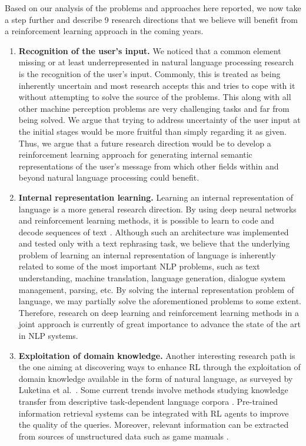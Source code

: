 \label{directions}
Based on our analysis of the problems and approaches here reported, we now take a step further and describe 9 research directions that we believe will benefit from a reinforcement learning approach in the coming years.
\begin{enumerate}
\item {\bf Recognition of the user's input.}
We noticed that a common element missing or at least underrepresented in natural language processing research is the recognition of the user's input. Commonly, this is treated as being inherently uncertain and most research accepts this and tries to cope with it without attempting to solve the source of the problems. This along with all other machine perception problems are very challenging tasks and far from being solved. We argue that trying to address uncertainty of the user input at the initial stages would be more fruitful than simply regarding it as given. Thus, we argue that a future research direction would be to develop a reinforcement learning approach for generating internal semantic representations of the user's message from which other fields within and beyond natural language processing could benefit. 
\item {\bf Internal representation learning.}
Learning an internal representation of language is a more general research direction. By using deep neural networks and reinforcement learning methods, it is possible to learn to code and decode sequences of text . Although such an architecture was implemented and tested only with a text rephrasing task, we believe that the underlying problem of learning an internal representation of language is inherently related to some of the most important NLP problems, such as text understanding, machine translation, language generation, dialogue system management, parsing, etc. By solving the internal representation problem of language, we may partially solve the aforementioned problems to some extent. Therefore, research on deep learning and reinforcement learning methods in a joint approach is currently of great importance to advance the state of the art in NLP systems.
\item {\bf Exploitation of domain knowledge.}
Another interesting research path is the one aiming at discovering ways to enhance RL through the exploitation of domain knowledge available in the form of natural language, as surveyed by Luketina et al.\ . Some current trends involve methods studying knowledge transfer from descriptive task-dependent language corpora . Pre-trained information retrieval systems can be integrated with RL agents  to improve the quality of the queries. Moreover, relevant information can be extracted from sources of unstructured data such as game manuals .

\end{enumerate}
